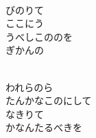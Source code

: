 \documentclass[10pt,b5j]{tarticle} %
\begin{document}
\begin{enumerate}
\begin{minipage}[c]{\blocksize}
        \vspace{\linespace}
        \item~\\
        びのりて\\
        ここにう\\
        うべしこののを\\
        ぎかんの
        
        \vspace{\linespace}
        \item~\\
        われらのら\\
        たんかなこのにして\\
        なきりて\\
        かなんたるべきを
    
    \end{minipage}
\end{enumerate} %
\end{document}
